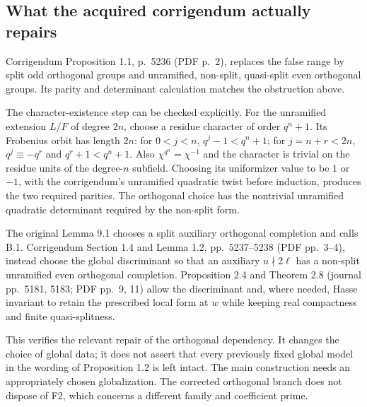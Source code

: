 \documentclass[10pt]{article}
\begin{document}
\subsection*{What the acquired corrigendum actually repairs}
Corrigendum Proposition 1.1, p. 5236 (PDF p. 2), replaces the false range by split odd orthogonal groups and unramified, non-split, quasi-split even orthogonal groups. Its parity and determinant calculation matches the obstruction above.\par
The character-existence step can be checked explicitly. For the unramified extension \(L/F\) of degree \(2n\), choose a residue character of order \(q^n+1\). Its Frobenius orbit has length \(2n\): for \(0<j<n\), \(q^j-1<q^n+1\); for \(j=n+r<2n\), \(q^j\equiv-q^r\) and \(q^r+1<q^n+1\). Also \(\chi^{q^n}=\chi^{-1}\) and the character is trivial on the residue units of the degree-\(n\) subfield. Choosing its uniformizer value to be \(1\) or \(-1\), with the corrigendum’s unramified quadratic twist before induction, produces the two required parities. The orthogonal choice has the nontrivial unramified quadratic determinant required by the non-split form.\par
The original Lemma 9.1 chooses a split auxiliary orthogonal completion and calls B.1. Corrigendum Section 1.4 and Lemma 1.2, pp. 5237–5238 (PDF pp. 3–4), instead choose the global discriminant so that an auxiliary \(u\nmid2\ell\) has a non-split unramified even orthogonal completion. Proposition 2.4 and Theorem 2.8 (journal pp. 5181, 5183; PDF pp. 9, 11) allow the discriminant and, where needed, Hasse invariant to retain the prescribed local form at \(w\) while keeping real compactness and finite quasi-splitness.\par
This verifies the relevant repair of the orthogonal dependency. It changes the choice of global data; it does not assert that every previously fixed global model in the wording of Proposition 1.2 is left intact. The main construction needs an appropriately chosen globalization. The corrected orthogonal branch does not dispose of F2, which concerns a different family and coefficient prime.\par
\end{document}
